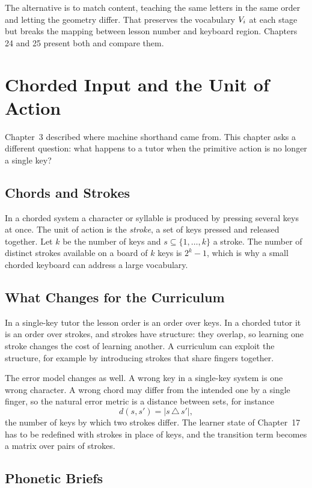The alternative is to match content, teaching the same letters in the same order and letting the geometry differ. That preserves the vocabulary $V_i$ at each stage but breaks the mapping between lesson number and keyboard region. Chapters 24 and 25 present both and compare them.

\chapter{Chorded Input and the Unit of Action}

Chapter~3 described where machine shorthand came from. This chapter asks a different question: what happens to a tutor when the primitive action is no longer a single key?

\section{Chords and Strokes}

In a chorded system a character or syllable is produced by pressing several keys at once. The unit of action is the \emph{stroke}, a set of keys pressed and released together. Let $k$ be the number of keys and $s\subseteq\{1,\dots,k\}$ a stroke. The number of distinct strokes available on a board of $k$ keys is $2^k-1$, which is why a small chorded keyboard can address a large vocabulary.

\section{What Changes for the Curriculum}

In a single-key tutor the lesson order is an order over keys. In a chorded tutor it is an order over strokes, and strokes have structure: they overlap, so learning one stroke changes the cost of learning another. A curriculum can exploit the structure, for example by introducing strokes that share fingers together.

The error model changes as well. A wrong key in a single-key system is one wrong character. A wrong chord may differ from the intended one by a single finger, so the natural error metric is a distance between sets, for instance
\[
d(s,s')=|s\,\triangle\,s'|,
\]
the number of keys by which two strokes differ. The learner state of Chapter~17 has to be redefined with strokes in place of keys, and the transition term becomes a matrix over pairs of strokes.

\section{Phonetic Briefs}

